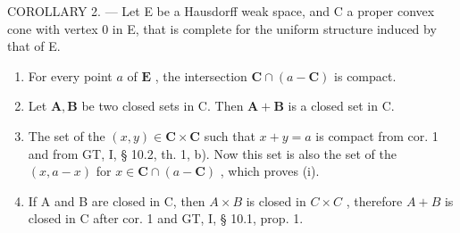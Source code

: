 COROLLARY 2. --- Let E be a Hausdorff weak space, and C a proper convex cone with vertex 0 in E, that is complete for the uniform structure induced by that of E.

\begin{enumerate}
\def\labelenumi{(\roman{enumi})}
\item
  For every point \(a\) of \(\mathbf{E}\) , the intersection \(\mathbf{C} \cap (a - \mathbf{C})\) is compact.
\item
  Let \(\mathbf{A},\mathbf{B}\) be two closed sets in C. Then \(\mathbf{A} + \mathbf{B}\) is a closed set in C.
\item
  The set of the \((x, y) \in \mathbf{C} \times \mathbf{C}\) such that \(x + y = a\) is compact from cor. 1 and from GT, I, § 10.2, th. 1, b). Now this set is also the set of the \((x, a - x)\) for \(x \in \mathbf{C} \cap (a - \mathbf{C})\) , which proves (i).
\item
  If A and B are closed in C, then \(A \times B\) is closed in \(C \times C\) , therefore \(A + B\) is closed in C after cor. 1 and GT, I, § 10.1, prop. 1.
\end{enumerate}

